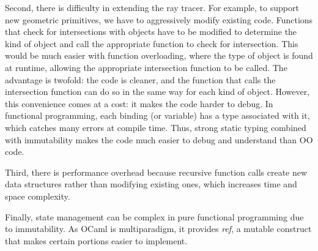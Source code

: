 \documentclass[conference]{IEEEtran}
\begin{document}
Second, there is difficulty in extending the ray tracer. For example, to support new geometric primitives, we have to aggressively modify existing code. Functions that check for intersections with objects have to be modified to determine the kind of object and call the appropriate function to check for intersection. This would be much easier with function overloading, where the type of object is found at runtime, allowing the appropriate intersection function to be called. The advantage is twofold: the code is cleaner, and the function that calls the intersection function can do so in the same way for each kind of object. However, this convenience comes at a cost: it makes the code harder to debug. In functional programming, each binding (or variable) has a type associated with it, which catches many errors at compile time. Thus, strong static typing combined with immutability makes the code much easier to debug and understand than OO code.

Third, there is performance overhead because recursive function calls create new data structures rather than modifying existing ones, which increases time and space complexity.

Finally, state management can be complex in pure functional programming due to immutability. As OCaml is multiparadigm, it provides \textit{ref}, a mutable construct that makes certain portions easier to implement.
\end{document}
